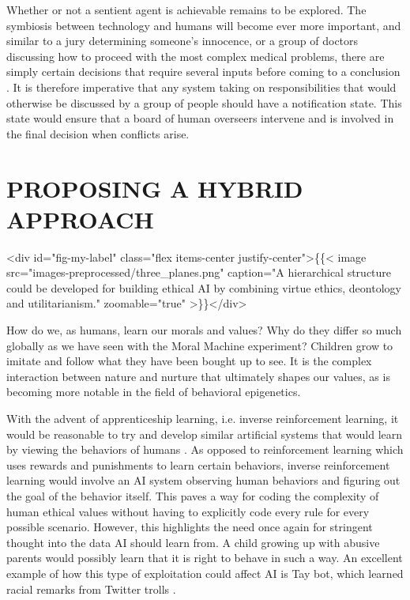 \documentclass[10pt]{article}
\begin{document}
Whether or not a sentient agent is achievable remains to be explored. The symbiosis between technology and humans will become ever more important, and similar to a jury determining someone’s innocence, or a group of doctors discussing how to proceed with the most complex medical problems, there are simply certain decisions that require several inputs before coming to a conclusion \textsuperscript{\cite{hindocha_moral_2022}}. It is therefore imperative that any system taking on responsibilities that would otherwise be discussed by a group of people should have a notification state. This state would ensure that a board of human overseers intervene and is involved in the final decision when conflicts arise. 

\section{PROPOSING A HYBRID APPROACH}

<div id="fig-my-label" class="flex items-center justify-center">\{\{< image src="images-preprocessed/three_planes.png" caption="A hierarchical structure could be developed for building ethical AI by combining virtue ethics, deontology and utilitarianism." zoomable="true" >\}\}</div>



How do we, as humans, learn our morals and values? Why do they differ so much globally as we have seen with the Moral Machine experiment? Children grow to imitate and follow what they have been bought up to see. It is the complex interaction between nature and nurture that ultimately shapes our values, as is becoming more notable in the field of behavioral epigenetics.

With the advent of apprenticeship learning, i.e. inverse reinforcement learning, it would be reasonable to try and develop similar artificial systems that would learn by viewing the behaviors of humans \textsuperscript{\cite{abel_reinforcement_2016}}. As opposed to reinforcement learning which uses rewards and punishments to learn certain behaviors, inverse reinforcement learning would involve an AI system observing human behaviors and figuring out the goal of the behavior itself. This paves a way for coding the complexity of human ethical values without having to explicitly code every rule for every possible scenario. However, this highlights the need once again for stringent thought into the data AI should learn from. A child growing up with abusive parents would possibly learn that it is right to behave in such a way. An excellent example of how this type of exploitation could affect AI is Tay bot, which learned racial remarks from Twitter trolls \textsuperscript{\cite{neff_talking_2016}}.
\end{document}
